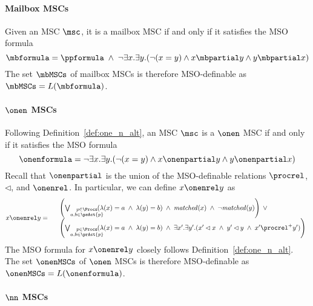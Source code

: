 \paragraph*{Mailbox MSCs}

Given an MSC $\msc$, it is a mailbox MSC if and only if it satisfies the MSO formula
\[
	\mbformula = \ppformula \;\wedge\; \neg \exists x.\exists y.(\neg (x = y) \wedge x \mbpartial y \wedge y \mbpartial x)
\]
The set $\mbMSCs$ of mailbox MSCs is therefore MSO-definable as $\mbMSCs=L(\mbformula)$.

\paragraph*{$\onen$ MSCs}

Following Definition~\ref{def:one_n_alt}, an MSC $\msc$ is a $\onen$ MSC if and only if it satisfies the MSO formula
\[
	\onenformula = \neg \exists x.\exists y.(\neg (x = y) \wedge x \onenpartial y \wedge y \onenpartial x)
\]
Recall that $\onenpartial$ is the union of the MSO-definable relations $\procrel$, $\lhd$, and $\onenrel$. In particular, we can define $x \onenrel y$ as
\[
x \onenrel y =
\begin{array}{rl}
& \left(
	\bigvee_{\substack{p \in \Procs\\a,b \in \psAct{p}}}\hspace{-1em}
	(\lambda(x) = a \;\wedge\; \lambda(y) = b)
	\;\wedge\; \mathit{matched}(x) \;\wedge\; \neg \mathit{matched}(y)
\right) \;\vee\\
& \left(
	\bigvee_{\substack{p \in \Procs\\a,b \in \prAct{p}}}\hspace{-1em}
	(\lambda(x) = a \;\wedge\; \lambda(y) = b)
	\;\wedge\;
	\exists x'.\exists y'. (x' \lhd x \;\wedge\; y' \lhd y \;\wedge\; x' \procrel^+ y')
\right)\\
\end{array}
\]
The MSO formula for $x \onenrel y$ closely follows Definition~\ref{def:one_n_alt}. The set $\onenMSCs$ of $\onen$ MSCs is therefore MSO-definable as $\onenMSCs=L(\onenformula)$.

\paragraph*{$\nn$ MSCs}

